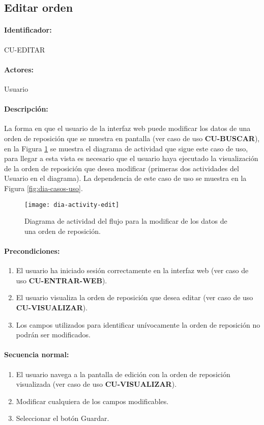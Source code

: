 \subsection{Editar orden}\label{cu-editar}
\paragraph{Identificador:}
CU-EDITAR
\paragraph{Actores:}
Usuario
\paragraph{Descripción:}
La forma en que el usuario de la interfaz web puede modificar los datos de una orden de reposición que se muestra en pantalla (ver caso de uso \textbf{CU-BUSCAR}), en la Figura \ref{fig:dia-activity-edit} se muestra el diagrama de actividad que sigue este caso de uso, para llegar a esta vista es necesario que el usuario haya ejecutado la visualización de la orden de reposición que desea modificar (primeras dos actividades del Usuario en el diagrama). La dependencia de este caso de uso se muestra en la Figura \ref{fig:dia-casos-uso}.
\begin{figure}[h]
  \centering
  \texttt{[image: dia-activity-edit]}
  \caption{Diagrama de actividad del flujo para la modificar de los datos de una orden de reposición.}
  \label{fig:dia-activity-edit}
\end{figure}
\paragraph{Precondiciones:}
\begin{enumerate}
  \item El usuario ha iniciado sesión correctamente en la interfaz web (ver caso de uso \textbf{CU-ENTRAR-WEB}).
  \item El usuario visualiza la orden de reposición que desea editar (ver caso de uso \textbf{CU-VISUALIZAR}).
  \item Los campos utilizados para identificar unívocamente la orden de reposición no podrán ser modificados. 
\end{enumerate}
\paragraph{Secuencia normal:}
\begin{enumerate}
  \item El usuario navega a la pantalla de edición con la orden de reposición visualizada (ver caso de uso \textbf{CU-VISUALIZAR}).
  \item Modificar cualquiera de los campos modificables.
  \item Seleccionar el botón Guardar.
\end{enumerate}
